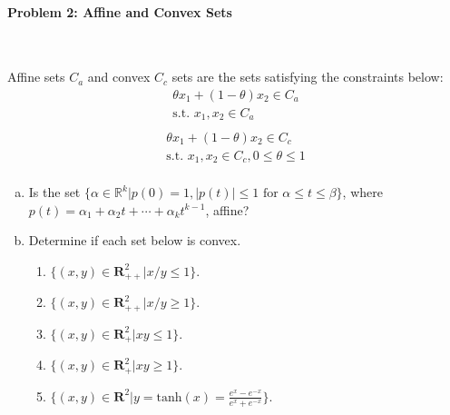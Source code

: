 \documentclass[a4paper]{article}
\begin{document}
\paragraph{Problem 2: Affine and Convex Sets}
~

Affine sets $C_{a}$ and convex $C_{c}$ sets are the sets satisfying the constraints below:
\begin{equation}
\begin{aligned}
    \theta x_1 + (1-\theta)x_2 \in C_{a}\\
    \text{s.t. } x_1, x_2 \in C_{ a}\\
\end{aligned}
\end{equation}
\begin{equation}
\begin{aligned}
    \theta x_1 + (1-\theta)x_2 \in C_{c}\\
    \text{s.t. } x_1, x_2 \in C_{c}, 0 \leq \theta \leq 1\\
\end{aligned}
\end{equation}

\noindent
\begin{enumerate}[a)]
    \item Is the set $\{  \alpha \in \mathbb{R}^k | p(0)=1, |p(t)|\leq1 \text{ for } \alpha \leq t \leq \beta\}$, where $p(t) = \alpha_1+\alpha_2t+\cdots+\alpha_kt^{k-1}$, affine?
    \item Determine if each set below is convex.
        \begin{enumerate}[1)]
            \item $\{  (x,y)\in \mathbf{R}^2_{++} | x/y \leq 1 \}$.
            \item $\{  (x,y)\in \mathbf{R}^2_{++} | x/y \geq 1 \}$.
            \item $\{  (x,y)\in \mathbf{R}^2_{+} | xy \leq 1 \}$.
            \item $\{  (x,y)\in \mathbf{R}^2_{+} | xy \geq 1 \}$.
            \item $\{  (x,y)\in \mathbf{R}^2 | y = \text{tanh}(x) = \frac{e^{x}-e^{-x}}{e^{x}+e^{-x}}\}$.
        \end{enumerate}
\end{enumerate}
\end{document}
